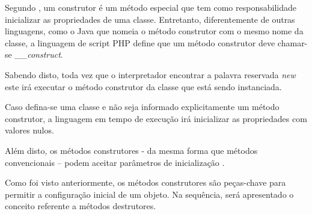 Segundo , um construtor é um método especial que tem
como responsabilidade inicializar as propriedades de uma classe. Entretanto,
diferentemente de outras linguagens, como o Java que nomeia o método
construtor com o mesmo nome da classe, a linguagem de script \acs{PHP} define que um
método construtor deve chamar-se \textit{\_\_construct}.

Sabendo disto, toda vez que o interpretador encontrar a palavra reservada
\textit{new} este irá executar o método construtor da classe que está sendo
instanciada.

Caso defina-se uma classe e não seja informado explicitamente um método
construtor, a linguagem em tempo de execução irá inicializar as propriedades com valores nulos.

Além disto, os métodos construtores - da mesma forma que métodos convencionais –
podem aceitar parâmetros de inicialização \cite{learningJava}.

Como foi visto anteriormente, os métodos construtores são peças-chave para
permitir a configuração inicial de um objeto. Na sequência, será apresentado o
conceito referente a métodos destrutores.
